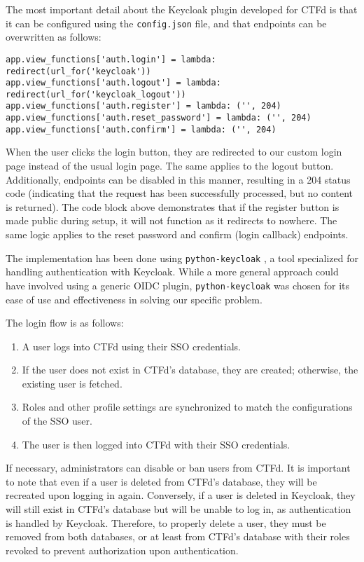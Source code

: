 The most important detail about the Keycloak plugin developed for CTFd is that it can be configured using the \texttt{config.json} file, and that endpoints can be overwritten as follows:

\begin{verbatim}
app.view_functions['auth.login'] = lambda: redirect(url_for('keycloak'))
app.view_functions['auth.logout'] = lambda: redirect(url_for('keycloak_logout'))
app.view_functions['auth.register'] = lambda: ('', 204)
app.view_functions['auth.reset_password'] = lambda: ('', 204)
app.view_functions['auth.confirm'] = lambda: ('', 204)
\end{verbatim}

When the user clicks the login button, they are redirected to our custom login page instead of the usual login page. The same applies to the logout button. Additionally, endpoints can be disabled in this manner, resulting in a 204 status code (indicating that the request has been successfully processed, but no content is returned). The code block above demonstrates that if the register button is made public during setup, it will not function as it redirects to nowhere. The same logic applies to the reset password and confirm (login callback) endpoints.

The implementation has been done using \texttt{python-keycloak} \parencite{python_keycloak}, a tool specialized for handling authentication with Keycloak. While a more general approach could have involved using a generic OIDC plugin, \texttt{python-keycloak} was chosen for its ease of use and effectiveness in solving our specific problem.

The login flow is as follows:

\begin{enumerate}
    \item A user logs into CTFd using their SSO credentials.
    \item If the user does not exist in CTFd's database, they are created; otherwise, the existing user is fetched.
    \item Roles and other profile settings are synchronized to match the configurations of the SSO user.
    \item The user is then logged into CTFd with their SSO credentials.
\end{enumerate}

If necessary, administrators can disable or ban users from CTFd. It is important to note that even if a user is deleted from CTFd's database, they will be recreated upon logging in again. Conversely, if a user is deleted in Keycloak, they will still exist in CTFd's database but will be unable to log in, as authentication is handled by Keycloak. Therefore, to properly delete a user, they must be removed from both databases, or at least from CTFd's database with their roles revoked to prevent authorization upon authentication.

